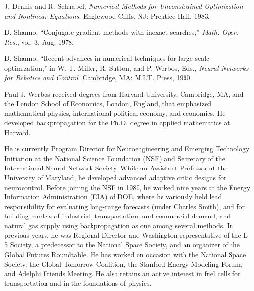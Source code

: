 \documentclass[journal]{IEEEtran} %
\begin{document}
\begin{thebibliography}{99}
J. Dennis and R. Schnabel, \emph{Numerical Methods for Unconstrained Optimization and Nonlinear Equations}. Englewood Cliffs, NJ: Prentice-Hall, 1983.

D. Shanno, ``Conjugate-gradient methods with inexact searches,'' \emph{Math. Oper. Res.}, vol. 3, Aug. 1978.

D. Shanno, ``Recent advances in numerical techniques for large-scale optimization,'' in W. T. Miller, R. Sutton, and P. Werbos, Eds., \emph{Neural Networks for Robotics and Control}. Cambridge, MA: M.I.T. Press, 1990.

\end{thebibliography}

\begin{IEEEbiography}{Paul J. Werbos}
received degrees from Harvard University, Cambridge, MA, and the London School of Economics, London, England, that emphasized mathematical physics, international political economy, and economics. He developed backpropagation for the Ph.D. degree in applied mathematics at Harvard.

He is currently Program Director for Neuroengineering and Emerging Technology Initiation at the National Science Foundation (NSF) and Secretary of the International Neural Network Society. While an Assistant Professor at the University of Maryland, he developed advanced adaptive critic designs for neurocontrol. Before joining the NSF in 1989, he worked nine years at the Energy Information Administration (EIA) of DOE, where he variously held lead responsibility for evaluating long-range forecasts (under Charles Smith), and for building models of industrial, transportation, and commercial demand, and natural gas supply using backpropagation as one among several methods. In previous years, he was Regional Director and Washington representative of the L-5 Society, a predecessor to the National Space Society, and an organizer of the Global Futures Roundtable. He has worked on occasion with the National Space Society, the Global Tomorrow Coalition, the Stanford Energy Modeling Forum, and Adelphi Friends Meeting. He also retains an active interest in fuel cells for transportation and in the foundations of physics.
\end{IEEEbiography}
\end{document}
